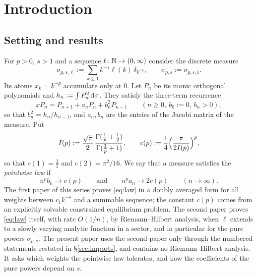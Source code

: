 \section{Introduction}\label{sec:intro}

\subsection{Setting and results}\label{sec:results}
For $p>0$, $s>1$ and a sequence $\ell\colon\mathbb{N}\to(0,\infty)$ consider the discrete measure
\begin{equation}\label{eq:sigma}
  \sigma_{p,s,\ell}:=\sum_{k\ge1}k^{-s}\ell(k)\,\delta_{k^{-p}},\qquad \sigma_{p,s}:=\sigma_{p,s,1}.
\end{equation}
Its atoms $x_k=k^{-p}$ accumulate only at $0$. Let $P_n$ be its monic orthogonal polynomials and
$h_n:=\int P_n^2\,\mathrm{d}\sigma$. They satisfy the three-term recurrence
\begin{equation}\label{eq:rec}
  xP_n=P_{n+1}+a_nP_n+b_n^2P_{n-1}\qquad(n\ge0,\ b_0:=0,\ b_n>0),
\end{equation}
so that $b_n^2=h_n/h_{n-1}$, and $a_n,b_n$ are the entries of the Jacobi matrix of the measure. Put
\begin{equation}\label{eq:cp}
  I(p):=\frac{\sqrt\pi}{2}\,\frac{\Gamma(\frac1p+\frac12)}{\Gamma(\frac1p+1)},\qquad
  c(p):=\frac14\Bigl(\frac{\pi}{2I(p)}\Bigr)^{p},
\end{equation}
so that $c(1)=\frac12$ and $c(2)=\pi^2/16$. We say that a measure satisfies the \emph{pointwise law} if
\begin{equation}\label{eq:law}
  n^pb_n\longrightarrow c(p)\qquad\text{and}\qquad n^pa_n\longrightarrow2c(p)\qquad(n\to\infty).
\end{equation}
The first paper of this series \cite{PaperI} proves \eqref{eq:law} in a doubly averaged form for all weights
between $c_1k^{-s}$ and a summable sequence; the constant $c(p)$ comes from an explicitly solvable constrained
equilibrium problem. The second paper \cite{PaperII} proves \eqref{eq:law} itself, with rate $O(1/n)$, by
Riemann--Hilbert analysis, when $\ell$ extends to a slowly varying analytic function in a sector, and in particular
for the pure powers $\sigma_{p,s}$. The present paper uses the second paper only through the numbered statements
restated in \S\ref{sec:imports}, and contains no Riemann--Hilbert analysis. It asks which weights the pointwise law
tolerates, and how the coefficients of the pure powers depend on $s$.


